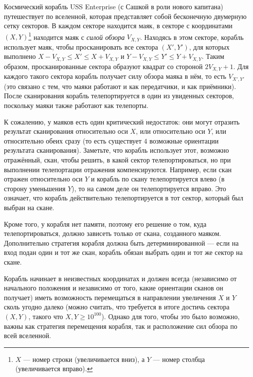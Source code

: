 \documentclass[12pt]{article}
\begin{document}
\renewcommand{\headerLang}{Русский}
\renewcommand{\problemName}{AB13. Vision}

\renewcommand{\headerLeft}{IATI Day 1, Senior group}
\renewcommand{\headerRightFirst}{XVII INTERNATIONAL ADVANCED TOURNAMENT IN INFORMATICS}
\renewcommand{\headerRightSecond}{ONLINE 2026}

\renewcommand{\tl}{$5$ s}
\renewcommand{\ml}{$1024$ MB}
\problem{Task \problemName}

Космический корабль USS Enterprise (с Сашкой в роли нового капитана) путешествует по вселенной, которая представляет собой бесконечную двумерную сетку секторов. В каждом секторе находится маяк, в секторе с координатами $(X, Y)$\footnote{$X$ --- номер строки (увеличивается вниз), а $Y$ --- номер столбца (увеличивается вправо).} находится маяк с \textit{силой обзора} $V_{X, Y}$. Находясь в этом секторе, корабль использует маяк, чтобы просканировать все сектора $(X', Y')$, для которых выполнено $X - V_{X, Y} \leq X' \leq X + V_{X, Y}$ и $Y - V_{X, Y} \leq Y' \leq Y + V_{X, Y}$. Таким образом, просканированные сектора образуют квадрат со стороной $2V_{X, Y} + 1$. Для каждого такого сектора корабль получает силу обзора маяка в нём, то есть $V_{X', Y'}$ (это связано с тем, что маяки работают и как передатчики, и как приёмники). После сканирования корабль телепортируется в один из увиденных секторов, поскольку маяки также работают как телепорты.

К сожалению, у маяков есть один критический недостаток: они могут отразить результат сканирования относительно оси $X$, или относительно оси $Y$, или относительно обеих сразу (то есть существует $4$ возможные ориентации результата сканирования). Заметьте, что корабль использует этот, возможно отражённый, скан, чтобы решить, в какой сектор телепортироваться, но при выполнении телепортации отражения компенсируются. Например, если скан отражен относительно оси $Y$ и корабль по скану телепортируется влево (в сторону уменьшения $Y$), то на самом деле он телепортируется вправо. Это означает, что корабль действительно телепортируется в тот сектор, который был выбран на скане.

Кроме того, у корабля нет памяти, поэтому его решение о том, куда телепортироваться, должно зависеть только от скана, созданного маяком. Дополнительно стратегия корабля должна быть детерминированной --- если на вход подан один и тот же скан, корабль обязан выбрать один и тот же сектор на скане.

Корабль начинает в неизвестных координатах и должен всегда (независимо от начального положения и независимо от того, какие ориентации сканов он получает) иметь возможность перемещаться в направлении увеличения $X$ и $Y$ сколь угодно далеко (можно считать, что требуется в итоге достичь сектора $(X, Y)$, такого что $X, Y \geq 10^{100}$). Однако для того, чтобы это было возможно, важны как стратегия перемещения корабля, так и расположение сил обзора по всей вселенной.
\end{document}
